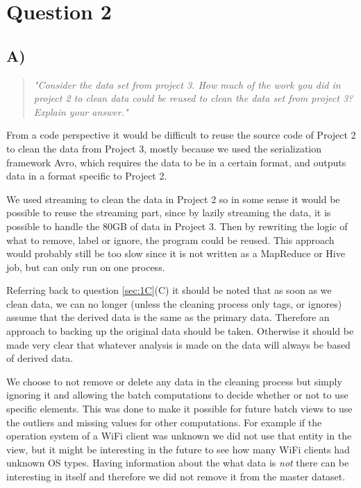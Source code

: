 \section{Question 2}

\subsection{A)}
\begin{quote}
	\textit{"Consider	the	data	set	from	project	3.	How	much	of	the	work	you	did	in	project	2	to	clean	data	could	be	reused	to	clean	the	data	set	from	project	3?	Explain	your	answer."}
\end{quote}
From a code perspective it would be difficult to reuse the source code of Project 2 to clean the data from Project 3, mostly because we used the serialization framework Avro, which requires the data to be in a certain format, and outputs data in a format specific to Project 2.

\newpar We used streaming to clean the data in Project 2 so in some sense it would be possible to reuse the streaming part, since by lazily streaming the data, it is possible to handle the 80GB of data in Project 3. Then by rewriting the logic of what to remove, label or ignore, the program could be reused. This approach would probably still be too slow since it is not written as a MapReduce or Hive job, but can only run on one process.

\newpar Referring back to question \ref{sec:1C}(C) it should be noted that as soon as we clean data, we can no longer (unless the cleaning process only tags, or ignores) assume that the derived data is the same as the primary data. Therefore an approach to backing up the original data should be taken. Otherwise it should be made very clear that whatever analysis is made on the data will always be based of derived data.

\newpar We choose to not remove or delete any data in the cleaning process but simply ignoring it and allowing the batch computations to decide whether or not to use specific elements. This was done to make it possible for future batch views to use the outliers and missing values for other computations. For example if the operation system of a WiFi client was unknown we did not use that entity in the view, but it might be interesting in the future to see how many WiFi clients had unknown OS types. Having information about the what data is \textit{not} there can be interesting in itself and therefore we did not remove it from the master dataset. 

